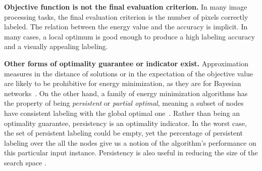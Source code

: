 

\textbf{Objective function is not the final evaluation criterion.} In many image processing tasks, the final evaluation criterion is the number of pixels correctly labeled. The relation between the energy value and the accuracy is implicit. In many cases, a local optimum is good enough to produce a high labeling accuracy and a visually appealing labeling.

\textbf{Other forms of optimality guarantee or indicator exist.} %
%
Approximation measures in the distance of solutions or in the expectation of the objective value are likely to be prohibitive for energy minimization, as they are for Bayesian networks~\cite{Kwisthout-11,Kwisthout-13, kwisthout2015tree}.
On the other hand, a family of energy minimization algorithms has the property of being {\em persistent} or {\em partial optimal}, meaning a subset of nodes have consistent labeling with the global optimal one~\cite{Boros:TR91-maxflow, BorosHammer01}. Rather than being an optimality guarantee, persistency is an optimality indicator. In the worst case, the set of persistent labeling could be empty, yet the percentage of persistent labeling over the all the nodes give us a notion of the algorithm's performance on this particular input instance. Persistency is also useful in reducing the size of the search space \cite{kohli2008partial, SSS-15-IRI}.




